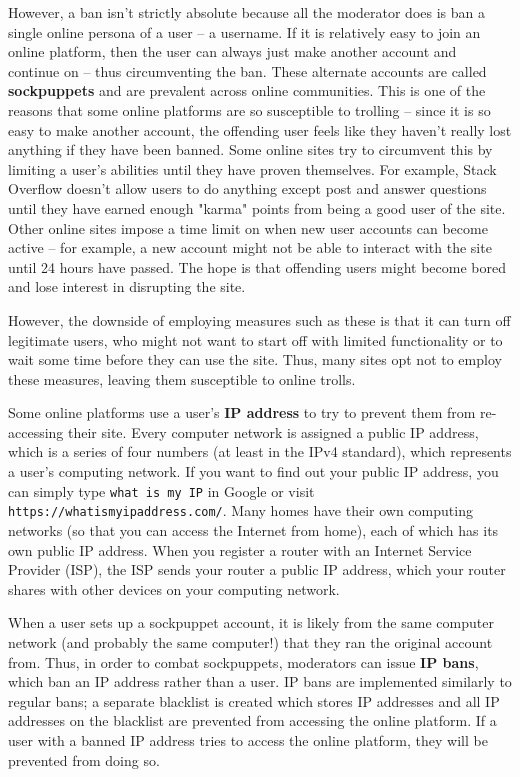 \documentclass[class=book, crop=false]{standalone}
\providecommand{\keyterm}[1]{\textbf{#1}\marginnote{\scriptsize \textbf{#1}}}
\begin{document}
However, a ban isn't strictly absolute because all the moderator does is ban a single online persona of a user -- a username. If it is relatively easy to join an online platform, then the user can always just make another account and continue on -- thus circumventing the ban. These alternate accounts are called \keyterm{sockpuppets} and are prevalent across online communities. This is one of the reasons that some online platforms are so susceptible to trolling -- since it is so easy to make another account, the offending user feels like they haven't really lost anything if they have been banned. Some online sites try to circumvent this by limiting a user's abilities until they have proven themselves. For example, Stack Overflow doesn't allow users to do anything except post and answer questions until they have earned enough "karma" points from being a good user of the site. Other online sites impose a time limit on when new user accounts can become active -- for example, a new account might not be able to interact with the site until 24 hours have passed. The hope is that offending users might become bored and lose interest in disrupting the site.

However, the downside of employing measures such as these is that it can turn off legitimate users, who might not want to start off with limited functionality or to wait some time before they can use the site. Thus, many sites opt not to employ these measures, leaving them susceptible to online trolls.

Some online platforms use a user's \keyterm{IP address} to try to prevent them from re-accessing their site. Every computer network is assigned a public IP address, which is a series of four numbers (at least in the IPv4 standard), which represents a user's computing network. If you want to find out your public IP address, you can simply type \texttt{what is my IP} in Google or visit \texttt{https://whatismyipaddress.com/}. Many homes have their own computing networks (so that you can access the Internet from home), each of which has its own public IP address. When you register a router with an Internet Service Provider (ISP), the ISP sends your router a public IP address, which your router shares with other devices on your computing network.

When a user sets up a sockpuppet account, it is likely from the same computer network (and probably the same computer!) that they ran the original account from. Thus, in order to combat sockpuppets, moderators can issue \keyterm{IP bans}, which ban an IP address rather than a user. IP bans are implemented similarly to regular bans; a separate blacklist is created which stores IP addresses and all IP addresses on the blacklist are prevented from accessing the online platform. If a user with a banned IP address tries to access the online platform, they will be prevented from doing so.
\end{document}
